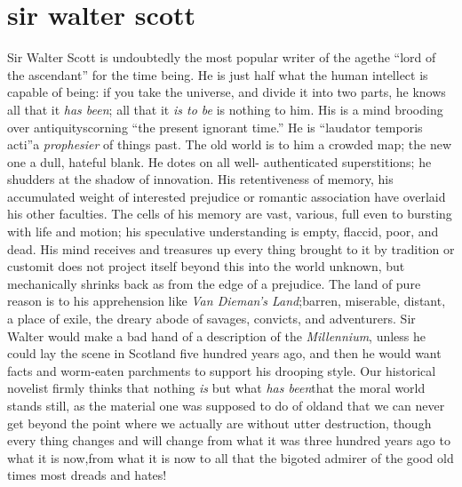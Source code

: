 \chapter[Sir Walter Scott]{sir walter scott}

Sir Walter Scott is undoubtedly the most popular writer of the
age\textemdash the ``lord of the ascendant'' for the time being. He is just
half what the human intellect is capable of being: if you take the
universe, and divide it into two parts, he knows all that it \emph{has
been}; all that it \emph{is to be} is nothing to him. His is a mind
brooding over antiquity\textemdash scorning ``the present ignorant time.'' He
is ``laudator temporis acti''\textemdash a \emph{prophesier} of things past. The
old world is to him a crowded map; the new one a dull, hateful
blank. He dotes on all well- authenticated superstitions; he
shudders at the shadow of innovation.  His retentiveness of
memory, his accumulated weight of interested prejudice or romantic
association have overlaid his other faculties. The cells of his
memory are vast, various, full even to bursting with life and
motion; his speculative understanding is empty, flaccid, poor, and
dead. His mind receives and treasures up every thing brought to it
by tradition or custom\textemdash it does not project itself beyond this
into the world unknown, but mechanically shrinks back as from the
edge of a prejudice. The land of pure reason is to his
apprehension like \emph{Van Dieman's Land};\textemdash barren, miserable,
distant, a place of exile, the dreary abode of savages, convicts,
and adventurers. Sir Walter would make a bad hand of a description
of the \emph{Millennium}, unless he could lay the scene in Scotland
five hundred years ago, and then he would want facts and
worm-eaten parchments to support his drooping style.  Our
historical novelist firmly thinks that nothing \emph{is} but what \emph{has
been}\textemdash that the moral world stands still, as the material one was
supposed to do of old\textemdash and that we can never get beyond the point
where we actually are without utter destruction, though every
thing changes and will change from what it was three hundred years
ago to what it is now,\textemdash from what it is now to all that the
bigoted admirer of the good old times most dreads and hates!

